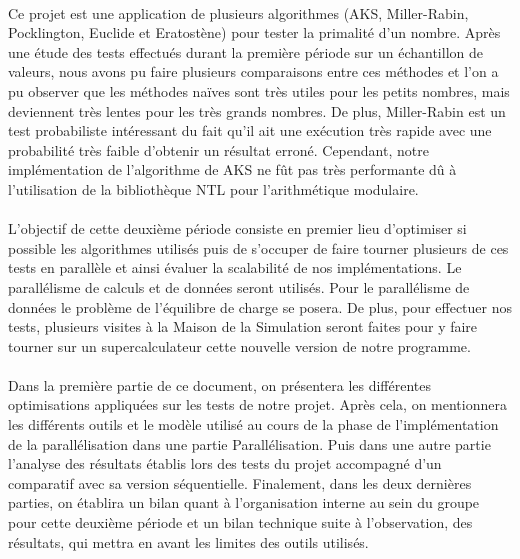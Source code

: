 	\paragraph{}Ce projet est une application de plusieurs algorithmes (AKS, Miller-Rabin, Pocklington, Euclide et Eratostène) pour tester la primalité d'un nombre. Après une étude des tests effectués durant la première période sur un échantillon de valeurs, nous avons pu faire plusieurs comparaisons entre ces méthodes et l'on a pu observer que les méthodes naïves sont très utiles pour les petits nombres, mais deviennent très lentes pour les très grands nombres. De plus, Miller-Rabin est un test probabiliste intéressant du fait qu'il ait une exécution très rapide avec une probabilité très faible d'obtenir un résultat erroné. Cependant, notre implémentation de l'algorithme de AKS ne fût pas très performante dû à l'utilisation de la bibliothèque NTL pour l'arithmétique modulaire.
	
	\paragraph{}L'objectif de cette deuxième période consiste en premier lieu d'optimiser si possible les algorithmes utilisés puis de s’occuper de faire tourner plusieurs de ces tests en parallèle et ainsi évaluer la scalabilité de nos implémentations. Le parallélisme de calculs et de données seront utilisés. Pour le parallélisme de données le problème de l'équilibre de charge se posera. De plus, pour effectuer nos tests, plusieurs visites à la Maison de la Simulation seront faites pour y faire tourner sur un supercalculateur cette nouvelle version de notre programme. 
	
	\paragraph{}Dans la première partie de ce document, on présentera les différentes optimisations appliquées sur les tests de notre projet.
	Après cela, on mentionnera les différents outils et le modèle utilisé au cours de la phase de l'implémentation de la parallélisation dans une partie Parallélisation. Puis dans une autre partie l'analyse des résultats établis lors des tests du projet accompagné d'un comparatif avec sa version séquentielle.
	Finalement, dans les deux dernières parties, on établira un bilan quant à l'organisation interne au sein du groupe pour cette deuxième période et un bilan technique suite à l'observation, des résultats, qui mettra en avant les limites des outils utilisés.
	
